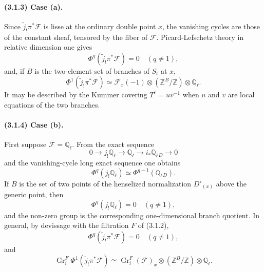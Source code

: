 \documentclass[11pt]{article}
\theoremstyle{remark}
\newcommand{\Ql}{\mathbb{Q}_\ell}
\begin{document}
\paragraph{(3.1.3) Case (a).}
Since $\tilde j_{!}\pi^*\mathcal F$ is lisse at the ordinary double point $x$, the vanishing cycles are those of the constant sheaf, tensored by the fiber of $\mathcal F$. Picard-Lefschetz theory in relative dimension one gives
\begin{equation}\tag{3.1.3.1}
\Phi^q(\tilde j_{!}\pi^*\mathcal F)=0\quad(q\ne1),
\end{equation}
and, if $B$ is the two-element set of branches of $S_t$ at $x$,
\begin{equation}\tag{3.1.3.2}
\Phi^1(\tilde j_{!}\pi^*\mathcal F)\simeq \mathcal F_x(-1)\otimes (\mathbb Z^B/\mathbb Z)\otimes\Ql .
\end{equation}
It may be described by the Kummer covering $T^\ell=uv^{-1}$ when $u$ and $v$ are local equations of the two branches.

\paragraph{(3.1.4) Case (b).}
First suppose $\mathcal F=\Ql$. From the exact sequence
\begin{equation}\tag{3.1.4.1}
0\to j_{!}\Ql\to \Ql\to i_{*}\Ql{}_{D}\to0
\end{equation}
and the vanishing-cycle long exact sequence one obtains
\begin{equation}\tag{3.1.4.2}
\Phi^q(j_{!}\Ql)\simeq \Phi^{q-1}(\Ql{}_{D}).
\end{equation}
If $B$ is the set of two points of the henselized normalization $D'_{(x)}$ above the generic point, then
\begin{equation}\tag{3.1.4.3}
\Phi^q(j_{!}\Ql)=0\quad(q\ne1),
\end{equation}
and the non-zero group is the corresponding one-dimensional branch quotient. In general, by devissage with the filtration $F$ of (3.1.2),
\begin{equation}\tag{3.1.4.5}
\Phi^q(\tilde j_{!}\pi^*\mathcal F)=0\quad(q\ne1),
\end{equation}
and
\begin{equation}\tag{3.1.4.6}
\operatorname{Gr}^F_i\Phi^1(\tilde j_{!}\pi^*\mathcal F)
\simeq \operatorname{Gr}^F_i(\mathcal F)_x\otimes(\mathbb Z^B/\mathbb Z)\otimes\Ql .
\end{equation}
\end{document}

